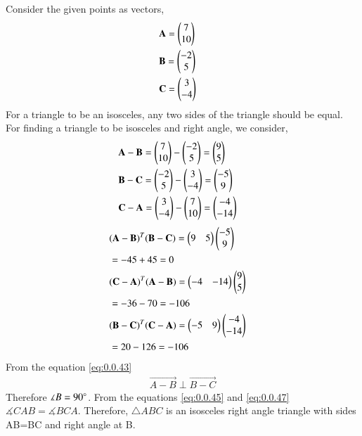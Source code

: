 \documentclass[journal,12pt,twocolumn]{IEEEtran}
\renewcommand\thesection{\arabic{section}}
\begin{document}
\begin{enumerate}[label=\thesection.\arabic*.,ref=\thesection.\theenumi]
\solution Consider the given points as vectors,
\begin{align}
&\mathbf{A}= \begin{pmatrix}7\\10\end{pmatrix}&\\
&\mathbf{B}=\begin{pmatrix}-2\\5\end{pmatrix}&\\
&\mathbf{C}=\begin{pmatrix}3\\-4\end{pmatrix}&
\end{align}
For a triangle to be an isosceles, any two sides of the triangle should be equal.
For finding a triangle to be isosceles and right angle, we consider,
\begin{align}
&\mathbf{A-B}= \begin{pmatrix}7\\10\end{pmatrix} - \begin{pmatrix}-2\\5\end{pmatrix} = \begin{pmatrix}9\\5\end{pmatrix}&\\
&\mathbf{B-C}= \begin{pmatrix}-2\\5\end{pmatrix} - \begin{pmatrix}3\\-4\end{pmatrix} = \begin{pmatrix}-5 \\ 9\end{pmatrix}&\\
&\mathbf{C-A}=  \begin{pmatrix}3\\-4\end{pmatrix} - \begin{pmatrix}7\\10\end{pmatrix} = \begin{pmatrix}-4\\ -14\end{pmatrix}&
\end{align}
\begin{align}
&\mathbf{(A-B)}^T\mathbf{(B-C)} = \begin{pmatrix}9&5\end{pmatrix}\begin{pmatrix}-5\\9\end{pmatrix} &\\&= -45+45 = 0 \label{eq:0.0.43}&\\
& \mathbf{(C-A)}^T\mathbf{(A-B)} = \begin{pmatrix}-4&-14\end{pmatrix}\begin{pmatrix}9\\5\end{pmatrix}&\\& = -36-70 = -106 \label{eq:0.0.45}&\\
 &\mathbf{(B-C)}^T\mathbf{(C-A)} = \begin{pmatrix}-5&9\end{pmatrix}\begin{pmatrix}-4\\-14\end{pmatrix}&\\& = 20-126 = -106 \label{eq:0.0.47}&
\end{align}
From the equation \eqref{eq:0.0.43} \begin{align} \vec{A-B} \perp \vec{B-C}\end{align} Therefore $\measuredangle{B} = 90\degree$.
From the equations \eqref{eq:0.0.45} and \eqref{eq:0.0.47} $\measuredangle{CAB}=\measuredangle{BCA}$.
Therefore, $\triangle{ABC}$ is an isosceles right angle triangle with sides AB=BC and right angle at B.
\bigskip
\begin{figure}[H]
	\centering

\end{figure}
\end{enumerate}
\end{document}
